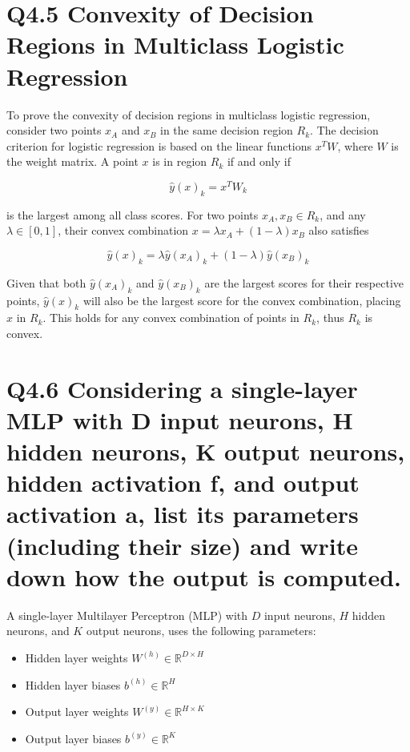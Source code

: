 \documentclass[11pt]{article}
\begin{document}
\section{Q4.5 Convexity of Decision Regions in Multiclass Logistic Regression}

To prove the convexity of decision regions in multiclass logistic regression, consider two points \( x_A \) and \( x_B \) in the same decision region \( R_k \). The decision criterion for logistic regression is based on the linear functions \( x^T W \), where \( W \) is the weight matrix. A point \( x \) is in region \( R_k \) if and only if

\[ \hat{y}(x)_k = x^T W_k \]

is the largest among all class scores. For two points \( x_A, x_B \in R_k \), and any \( \lambda \in [0, 1] \), their convex combination \( x = \lambda x_A + (1 - \lambda)x_B \) also satisfies

\[ \hat{y}(x)_k = \lambda \hat{y}(x_A)_k + (1 - \lambda)\hat{y}(x_B)_k \]

Given that both \( \hat{y}(x_A)_k \) and \( \hat{y}(x_B)_k \) are the largest scores for their respective points, \( \hat{y}(x)_k \) will also be the largest score for the convex combination, placing \( x \) in \( R_k \). This holds for any convex combination of points in \( R_k \), thus \( R_k \) is convex.


\section{Q4.6 Considering a single-layer MLP with D input neurons, H hidden neurons, K output neurons, hidden activation f, and output activation a, list its parameters (including their size) and write down how the output is computed.}

A single-layer Multilayer Perceptron (MLP) with \( D \) input neurons, \( H \) hidden neurons, and \( K \) output neurons, uses the following parameters:

\begin{itemize}
    \item Hidden layer weights \( W^{(h)} \in \mathbb{R}^{D \times H} \)
    \item Hidden layer biases \( b^{(h)} \in \mathbb{R}^{H} \)
    \item Output layer weights \( W^{(y)} \in \mathbb{R}^{H \times K} \)
    \item Output layer biases \( b^{(y)} \in \mathbb{R}^{K} \)
\end{itemize}
\end{document}
